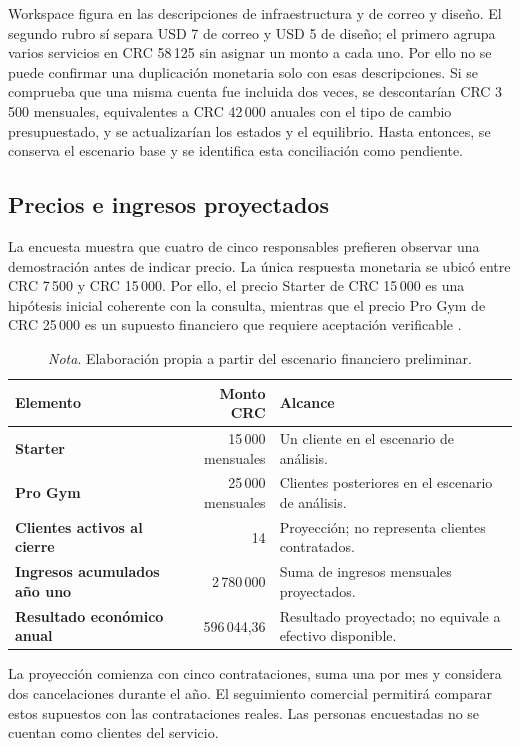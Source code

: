 Workspace figura en las descripciones de infraestructura y de correo y diseño.
El segundo rubro sí separa USD 7 de correo y USD 5 de diseño; el primero agrupa
varios servicios en CRC 58\,125 sin asignar un monto a cada uno. Por ello no se
puede confirmar una duplicación monetaria solo con esas descripciones. Si se
comprueba que una misma cuenta fue incluida dos veces, se descontarían
CRC 3\,500 mensuales, equivalentes a CRC 42\,000 anuales con el tipo de cambio
presupuestado, y se actualizarían los estados y el equilibrio. Hasta entonces,
se conserva el escenario base y se identifica esta conciliación como pendiente.

\subsection{Precios e ingresos proyectados}

La encuesta muestra que cuatro de cinco responsables prefieren observar una
demostración antes de indicar precio. La única respuesta monetaria se ubicó entre
CRC 7\,500 y CRC 15\,000. Por ello, el precio Starter de CRC 15\,000 es una
hipótesis inicial coherente con la consulta, mientras que el precio Pro Gym de
CRC 25\,000 es un supuesto financiero que requiere aceptación verificable
\parencite{encuesta_gymhub_2026}.

\begin{table}[htbp]
\caption{Precios y escenario de ingresos del primer año}
\begin{tabularx}{\textwidth}{>{\bfseries}p{3cm}r X}
\toprule
Elemento & Monto CRC & Alcance \\
\midrule
Starter & 15\,000 mensuales & Un cliente en el escenario de análisis. \\
Pro Gym & 25\,000 mensuales & Clientes posteriores en el escenario de análisis. \\
Clientes activos al cierre & 14 & Proyección; no representa clientes contratados. \\
Ingresos acumulados año uno & 2\,780\,000 & Suma de ingresos mensuales proyectados. \\
Resultado económico anual & 596\,044,36 & Resultado proyectado; no equivale a efectivo disponible. \\
\bottomrule
\end{tabularx}
\caption*{\textit{Nota}. Elaboración propia a partir del escenario financiero preliminar.}
\end{table}

La proyección comienza con cinco contrataciones, suma una por mes y considera
dos cancelaciones durante el año. El seguimiento comercial permitirá comparar
estos supuestos con las contrataciones reales. Las personas encuestadas no se
cuentan como clientes del servicio.

